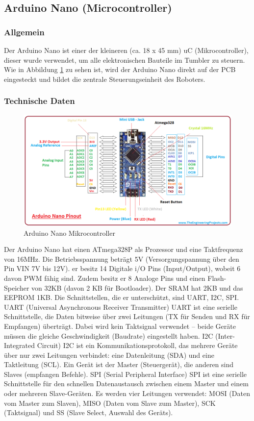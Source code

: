 \subsection{Arduino Nano (Microcontroller)}
%
\subsubsection{Allgemein}
Der Arduino Nano ist einer der kleineren (ca. 18 x 45 mm) uC (Mikrocontroller), dieser wurde verwendet, um alle elektronischen Bauteile im Tumbler zu steuern. Wie in Abbildung \ref{fig:arduino_nano} zu sehen ist, wird der Arduino Nano direkt auf der PCB eingesteckt und bildet die zentrale Steuerungseinheit des Roboters.
\subsubsection{Technische Daten}
\begin{figure}[H]
    \centering
    \includegraphics[width=1\textwidth]{img/Hardware/arduino_nano.png}
    \caption{Arduino Nano Mikrocontroller}
    \label{fig:arduino_nano}
\end{figure}
Der Arduino Nano hat einen ATmega328P als Prozessor und eine Taktfrequenz von 16MHz. Die Betriebsspannung beträgt 5V (Versorgungspannung über den Pin VIN 7V bis 12V). 
er besitz 14 Digitale i/O Pins (Input/Output), wobeit 6 davon PWM fähig sind. Zudem besitz er 8 Analoge Pins und einen Flash-Speicher von 32KB (davon 2 KB für Bootloader). 
Der SRAM hat 2KB und das EEPROM 1KB. Die Schnittstellen, die er unterschützt, sind UART, I2C, SPI.
UART (Universal Asynchronous Receiver Transmitter)
UART ist eine serielle Schnittstelle, die Daten bitweise über zwei Leitungen (TX für Senden und RX für Empfangen) überträgt. 
Dabei wird kein Taktsignal verwendet – beide Geräte müssen die gleiche Geschwindigkeit (Baudrate) eingestellt haben.
I2C (Inter-Integrated Circuit)
I2C ist ein Kommunikationsprotokoll, das mehrere Geräte über nur zwei Leitungen verbindet: eine Datenleitung (SDA) und eine Taktleitung (SCL). 
Ein Gerät ist der Master (Steuergerät), die anderen sind Slaves (empfangen Befehle).
SPI (Serial Peripheral Interface)
SPI ist eine serielle Schnittstelle für den schnellen Datenaustausch zwischen einem Master und einem oder mehreren Slave-Geräten. 
Es werden vier Leitungen verwendet: MOSI (Daten vom Master zum Slaven), MISO (Daten vom Slave zum Master), SCK (Taktsignal) und SS (Slave Select, Auswahl des Geräts).
